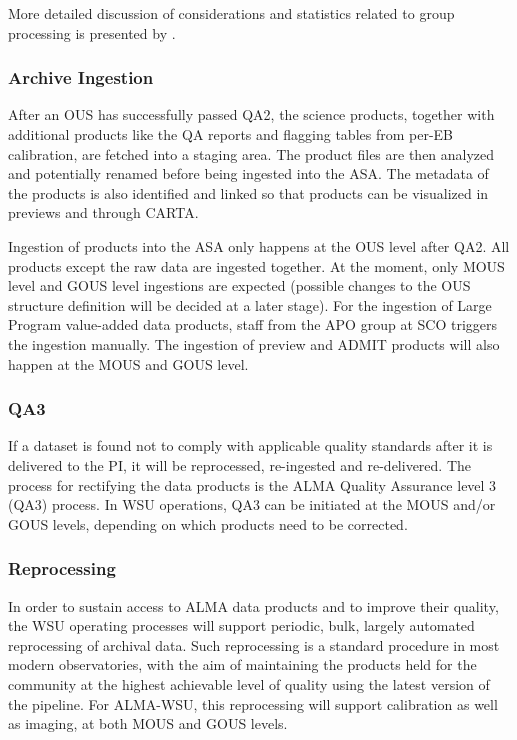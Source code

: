 More detailed discussion of considerations and statistics  related to group processing is presented by \cite{groupTsi}.

\subsubsection{Archive Ingestion} \label{subsec:archiveIngestion}

After an \ac{OUS} has successfully passed QA2, the science products, together with additional products like the \ac{QA} reports and flagging tables from per-EB calibration, are fetched into a staging area. The product files are then analyzed and potentially renamed before being ingested into the \ac{ASA}. The metadata of the products is also identified and linked so that products can be visualized in previews and through \ac{CARTA}.

Ingestion of products into the ASA only happens at the OUS level after QA2. All products except the raw data are ingested together. 
At the moment, only MOUS level and GOUS level ingestions are expected (possible changes to the OUS structure definition will be decided at a later stage).  For the ingestion of Large Program value-added data products, staff from the \ac{APO} group at \ac{SCO} triggers the ingestion manually. The ingestion of preview and \ac{ADMIT} products will also happen at the MOUS and GOUS level.

\subsubsection{QA3}
\label{sec:qa3}

If a dataset is found not to comply with applicable quality standards after it is delivered to the PI, it will be reprocessed, re-ingested and re-delivered. The process for rectifying the data products is the ALMA Quality Assurance level 3 (QA3) process. In WSU operations, QA3 can be initiated at the MOUS and/or GOUS levels, depending on which products need to be corrected. 


\subsubsection{Reprocessing}
\label{sec:reprocessing}

In order to sustain access to ALMA data products and to improve their quality, the WSU operating processes will support periodic, bulk, largely automated  reprocessing of archival data.  Such reprocessing is a standard procedure in most modern observatories, with the aim of maintaining the products held for the community at the highest achievable level of quality using the latest version of the pipeline. For ALMA-WSU, this reprocessing will support calibration as well as imaging, at both MOUS and GOUS levels. 

